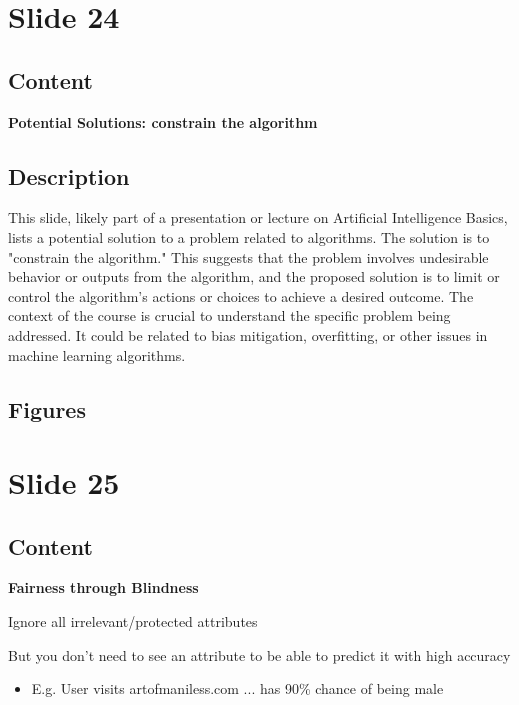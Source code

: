 \documentclass{article}%
\begin{document}
%
\newpage%
\section{Slide 24}%
\label{sec:Slide24}%
\subsection{Content}%

\textbf{Potential Solutions: constrain the algorithm}
%
\subsection{Description}%
This slide, likely part of a presentation or lecture on Artificial Intelligence Basics, lists a potential solution to a problem related to algorithms.  The solution is to "constrain the algorithm."  This suggests that the problem involves undesirable behavior or outputs from the algorithm, and the proposed solution is to limit or control the algorithm's actions or choices to achieve a desired outcome.  The context of the course is crucial to understand the specific problem being addressed.  It could be related to bias mitigation, overfitting, or other issues in machine learning algorithms.%
\subsection{Figures}%
\begin{figure}[H]%
\centering%
\end{figure}

%
\newpage%
\section{Slide 25}%
\label{sec:Slide25}%
\subsection{Content}%

\textbf{Fairness through Blindness}

Ignore all irrelevant/protected attributes

But you don't need to see an attribute to be able to predict it with high accuracy

\begin{itemize}
    \item E.g. User visits artofmaniless.com ... has 90\% chance of being male
\end{itemize}
%
\end{document}
